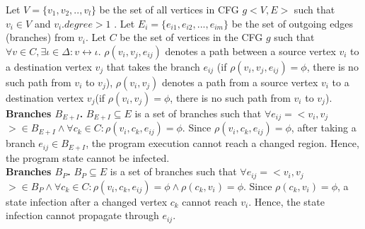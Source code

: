 Let $V=\{v_1,v_2,..,v_l\}$ be the set of all vertices in CFG $g$$<V, E$$>$ such that $ v_i \in V$ and $v_i.degree >1$ . Let $E_i = \{e_{i1}, e_{i2},...,e_{im}\}$ be the set of outgoing edges (branches) from $v_i$. Let $C$ be the set of vertices in the CFG $g$ 
such that $\forall v \in C, \exists \iota \in \Delta : v \leftrightarrow \iota$.  $\rho(v_i, v_j, e_{ij})$ denotes a path between a source vertex $v_i$ to a destination vertex $v_j$ that takes the branch $e_{ij}$ (if $\rho(v_i, v_j, e_{ij}) =\phi$, there is no such path from $v_i$ to $v_j$), $\rho(v_i, v_j)$ denotes a path from a source vertex $v_i$ to a 
destination vertex $v_j$(if $\rho(v_i, v_j)=\phi$, there is no such path from $v_i$ to $v_j$).
\\ \textbf{Branches $B_{E+I}$. } 
$B_{E+I} \subseteq E$ is a set of branches such that $\forall e_{ij} = $$<v_i, v_j$$> \in B_{E+I} 
\wedge \forall c_k\in C: \rho(v_i, c_k, e_{ij}) = \phi$. 
Since $\rho(v_i, c_k, e_{ij}) = \phi$, after taking a branch $e_{ij} \in  B_{E+I}$, the
program execution cannot reach a changed region. Hence, the program state cannot be infected. 
\\ \textbf{Branches $B_P$. }
$B_{P} \subseteq E$ is a set of branches such that $\forall e_{ij} = $$<v_i, v_j$$> \in B_{P} 
\wedge \forall c_k\in C: \rho(v_i, c_k, e_{ij}) = \phi \wedge \rho(c_k, v_i) = \phi$. 
Since $\rho(c_k, v_i) = \phi$, a state infection after a changed vertex $c_k$ cannot reach $v_i$. 
Hence, the state infection cannot propagate through $e_{ij}$.



